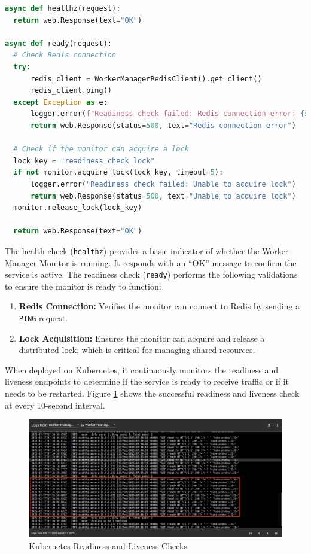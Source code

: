 \begin{lstlisting}[language=python, caption={Worker Manager Monitor Health and Readiness Checks}, label={lst:health_check}]
async def healthz(request):
  return web.Response(text="OK")

async def ready(request):
  # Check Redis connection
  try:
      redis_client = WorkerManagerRedisClient().get_client()
      redis_client.ping()
  except Exception as e:
      logger.error(f"Readiness check failed: Redis connection error: {str(e)}")
      return web.Response(status=500, text="Redis connection error")

  # Check if the monitor can acquire a lock
  lock_key = "readiness_check_lock"
  if not monitor.acquire_lock(lock_key, timeout=5):
      logger.error("Readiness check failed: Unable to acquire lock")
      return web.Response(status=500, text="Unable to acquire lock")
  monitor.release_lock(lock_key)

  return web.Response(text="OK")
\end{lstlisting}

The health check (\texttt{healthz}) provides a basic indicator of whether the Worker Manager Monitor is running. It responds with an “OK” message to confirm the service is active.
The readiness check (\texttt{ready}) performs the following validations to ensure the monitor is ready to function:
\begin{enumerate}
    \item \textbf{Redis Connection:} Verifies the monitor can connect to Redis by sending a \texttt{PING} request.
    \item \textbf{Lock Acquisition:} Ensures the monitor can acquire and release a distributed lock, which is critical for managing shared resources.
\end{enumerate}

When deployed on Kubernetes, it continuously monitors the readiness and liveness endpoints to determine if the service is ready to receive traffic or if it needs to be restarted. Figure \ref{fig:k8s_healthcheck} shows the successful readiness and liveness check at every 10-second interval.

\begin{figure}[H]
  \centering
  \includegraphics[width=\textwidth]{figures/k8s_healthcheck.png}
  \caption{Kubernetes Readiness and Liveness Checks}
  \label{fig:k8s_healthcheck}
\end{figure}

